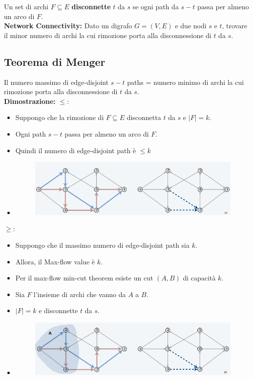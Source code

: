 Un set di archi $F \subseteq E$ \textbf{disconnette} $t$ da $s$ se
ogni path da $s-t$ passa per almeno un arco di $F$.\\

\textbf{Network Connectivity:} Dato un digrafo $G = (V,E)$ e due nodi
$s$ e $t$, trovare il minor numero di archi la cui rimozione porta
alla disconnessione di $t$ da $s$.\\

\subsection{Teorema di Menger}

Il numero massimo di edge-disjoint $s-t$ paths = numero minimo di
archi la cui rimozione porta alla disconnessione di $t$ da $s$.\\

\textbf{Dimostrazione:} $\le:$
\begin{itemize}
	\item Suppongo che la rimozione di $F \subseteq E$ disconnetta $t$ da $s$ e $|F| = k$.
	\item Ogni path $s-t$ passa per almeno un arco di $F$.
	\item Quindi il numero di edge-disjoint path è $\le k$
	\item \begin{figure}[H]
		      \centering
		      \includegraphics[width = 12cm]{capitoli/network_flow/imgs/bipartite4.png}
	      \end{figure}
\end{itemize}

$\ge :$
\begin{itemize}
	\item Suppongo che il massimo numero di edge-disjoint path sia $k$.
	\item Allora, il Max-flow value è $k$.
	\item Per il max-flow min-cut theorem esiste un cut $(A,B)$ di capacità $k$.
	\item Sia $F$ l'insieme di archi che vanno da $A$ a $B$.
	\item $|F| = k$ e disconnette $t$ da $s$.
	\item  \begin{figure}[H]
		      \centering
		      \includegraphics[width = 12cm]{capitoli/network_flow/imgs/bipartite5.png}
	      \end{figure}
\end{itemize}

%

